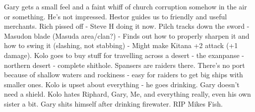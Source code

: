 Gary gets a small feel and a faint whiff of church corruption somehow in the air or something. He’s not impressed.\medskip
Hestor guides us to friendly and useful merchants.\medskip
Rich pissed off - Steve H doing it now.\medskip
Pilch tracks down the sword - Masudon blade (Masuda area/clan?) - Finds out how to properly sharpen it and how to swing it (slashing, not stabbing) - Might make Kitana +2 attack (+1 damage).\medskip
Kolo goes to buy stuff for travelling across a desert - the exanpanse - northern desert - complete shithole. Spansers are raiders there.\medskip
There’s no port because of shallow waters and rockiness - easy for raiders to get big ships with smaller ones.\medskip
Kolo is upset about everything - he goes drinking. Gary doesn’t need a shield.\medskip
Kolo hates Riphard, Gary, Me, and everything really, even his own sister a bit.\medskip
Gary shits himself after drinking firewater.\medskip
RIP Mikes Fish.
